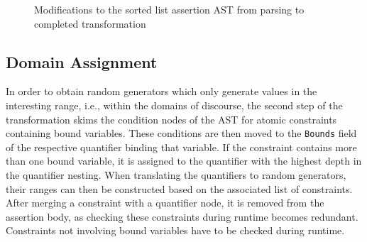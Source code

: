 \begin{figure}[t]
{}
\hfill
{}
\caption{Modifications to the sorted list assertion AST from parsing to completed transformation}
\end{figure}

\subsection{Domain Assignment}\label{sec:transf_domains}
In order to obtain random generators which only generate values in the interesting range, i.e., within the domains of discourse, the second step of the transformation skims the condition nodes of the AST for atomic constraints containing bound variables. These conditions are then moved to the \texttt{Bounds} field of the respective quantifier binding that variable. If the constraint contains more than one bound variable, it is assigned to the quantifier with the highest depth in the quantifier nesting. When translating the quantifiers to random generators, their ranges can then be constructed based on the associated list of constraints. After merging a constraint with a quantifier node, it is removed from the assertion body, as checking these constraints during runtime becomes redundant. Constraints not involving bound variables have to be checked during runtime. 

